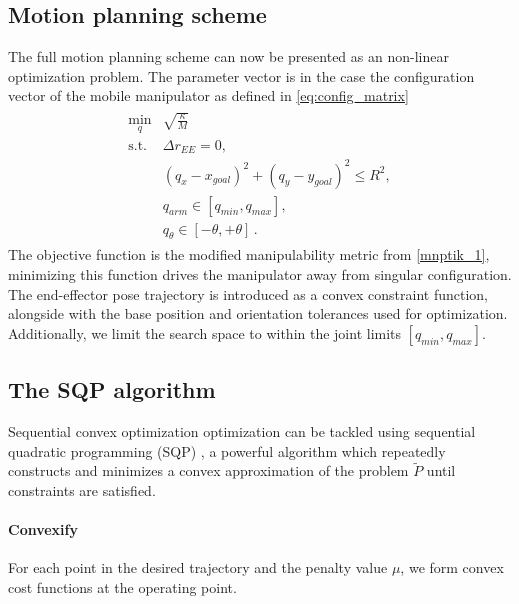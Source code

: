 \documentclass[times, utf8, diplomski, english]{fer}
\begin{document}
\subsection{Motion planning scheme}
The full motion planning scheme can now be presented as an non-linear optimization problem. 
The parameter vector is in the case the configuration vector of the mobile manipulator as defined in \eqref{eq:config_matrix}
\begin{align}
\begin{array}{rl}
\label{mnptik_2}
\min\limits_{q} &  \sqrt{\frac{\kappa}{M}}\\
\mbox{s.t.} & \Delta r_{EE} = 0, \\ 
& \left(q_{x} - x_{goal}\right)^2 + \left(q_{y} - y_{goal}\right)^2 \le R^2 , \\
& q_{arm} \in \left[q_{min}, q_{max}\right] , \\
& q_{\theta} \in \left[-\theta , +\theta \right]\, .
\end{array}
\end{align}
The objective function is the modified manipulability metric from \eqref{mnptik_1}, minimizing this function drives the manipulator away from singular configuration.
The end-effector pose trajectory is introduced as a convex constraint function, alongside with the base position and orientation tolerances used for optimization.
Additionally, we limit the search space to within the joint limits $[q_{min}, q_{max}]$.
\subsection{The SQP algorithm}
Sequential convex optimization optimization can be tackled using sequential quadratic programming (SQP) \citep{schulman2013finding, xu2010two}, a powerful algorithm which repeatedly constructs and minimizes a convex approximation of the problem $\tilde{P}$ until constraints are satisfied.
\paragraph*{Convexify}
For each point in the desired trajectory and the penalty value $\mu$, we form convex cost functions at the operating point.
\end{document}
